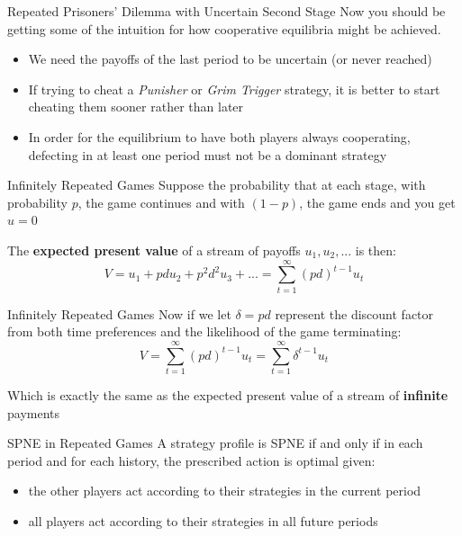 \begin{frame}{Repeated Prisoners' Dilemma with Uncertain Second Stage}
  Now you should be getting some of the intuition for how cooperative equilibria might be achieved.
  \begin{itemize}
    \item We need the payoffs of the last period to be uncertain (or never reached)
    \item If trying to cheat a \textit{Punisher} or \textit{Grim Trigger} strategy, 
    it is better to start cheating them sooner rather than later
    \item In order for the equilibrium to have both players always cooperating,
    defecting in at least one period must not be a dominant strategy
  \end{itemize}
\end{frame}

\begin{frame}{Infinitely Repeated Games}
  Suppose the probability that at each stage, with probability $p$, the game continues and with $(1-p)$, the game ends and you get $u=0$

  The \textbf{expected present value} of a stream of payoffs $u_1, u_2, ...$ is then:
  $$ V = u_1 + p d u_2 + p^2 d^2 u_3 + ... = \sum_{t=1}^{\infty}(pd)^{t-1}u_t $$
\end{frame}

\begin{frame}{Infinitely Repeated Games}
  Now if we let $\delta = pd$ represent the discount factor from both time preferences and the likelihood of the game terminating:
  $$ V = \sum_{t=1}^{\infty}(pd)^{t-1}u_t = \sum_{t=1}^{\infty}\delta^{t-1}u_t $$

  Which is exactly the same as the expected present value of a stream of \textbf{infinite} payments
\end{frame}

\begin{frame}{SPNE in Repeated Games}
  A strategy profile is SPNE if and only if in each period and for each history, the prescribed action is optimal given:
  \begin{itemize}
    \item the other players act according to their strategies in the current period
    \item all players act according to their strategies in all future periods
  \end{itemize}
\end{frame}

